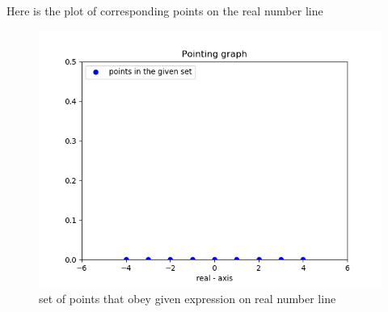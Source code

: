 \documentclass[16pt, a4paper, two column]{article}
\begin{document}
\noindent Here is the plot of corresponding points on the real number line\\
\begin{figure}[h]
    \includegraphics[width =\columnwidth]{Figure_2}
    \caption{set of points that obey given expression on real number line}
    \label{fig:mesh1}
\end{figure}
\end{document}
